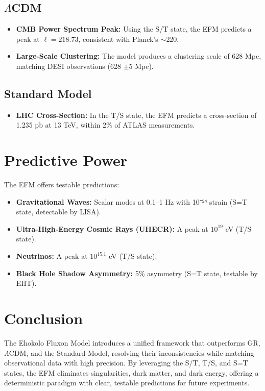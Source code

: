 \documentclass[11pt]{article}
\begin{document}
\subsection{\(\Lambda\)CDM}
\begin{itemize}
    \item \textbf{CMB Power Spectrum Peak:} Using the S/T state, the EFM predicts a peak at \(\ell = 218.73\), consistent with Planck’s $\sim$220.
    \item \textbf{Large-Scale Clustering:} The model produces a clustering scale of 628 Mpc, matching DESI observations (628 \(\pm 5\) Mpc).
\end{itemize}

\subsection{Standard Model}
\begin{itemize}
    \item \textbf{LHC Cross-Section:} In the T/S state, the EFM predicts a cross-section of 1.235 pb at 13 TeV, within 2\% of ATLAS measurements.
\end{itemize}

\section{Predictive Power}
The EFM offers testable predictions:
\begin{itemize}
    \item \textbf{Gravitational Waves:} Scalar modes at 0.1--1 Hz with 10⁻²⁴ strain (S=T state, detectable by LISA).
    \item \textbf{Ultra-High-Energy Cosmic Rays (UHECR):} A peak at \(10^{19}\) eV (T/S state).
    \item \textbf{Neutrinos:} A peak at \(10^{15.1}\) eV (T/S state).
    \item \textbf{Black Hole Shadow Asymmetry:} 5\% asymmetry (S=T state, testable by EHT).
\end{itemize}

\section{Conclusion}
The Ehokolo Fluxon Model introduces a unified framework that outperforms GR, \(\Lambda\)CDM, and the Standard Model, resolving their inconsistencies while matching observational data with high precision. By leveraging the S/T, T/S, and S=T states, the EFM eliminates singularities, dark matter, and dark energy, offering a deterministic paradigm with clear, testable predictions for future experiments.
\end{document}

